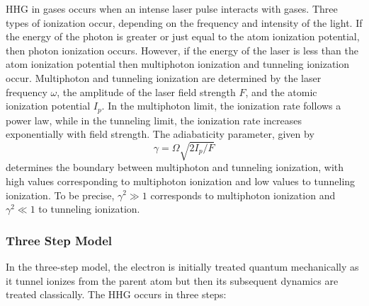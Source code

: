 \documentclass[12pt]{article}
\begin{document}
HHG in gases occurs when an intense laser pulse interacts with gases. Three types of ionization occur, depending on the frequency and intensity of the light. If the energy of the photon is greater or just equal to the atom ionization potential, then photon ionization occurs. However, if the energy of the laser is less than the atom ionization potential then multiphoton ionization and tunneling ionization occur. Multiphoton and tunneling ionization are determined by the laser frequency \(\omega\), the amplitude of the laser field strength $F$, and the atomic ionization potential \(I_p\). In the multiphoton limit, the ionization rate follows a power law, while in the tunneling limit, the ionization rate increases exponentially with field strength. The adiabaticity parameter, given by
\begin{equation}
    \label{eq:adiabatic}
    \gamma =\Omega \sqrt{2I_p/F}
\end{equation}
determines the boundary between multiphoton and tunneling ionization, with high values corresponding to multiphoton ionization and low values to tunneling ionization. To be precise, $\gamma^2 \gg 1$ corresponds to multiphoton ionization and $\gamma^2 \ll 1$ to tunneling ionization.\cite{gas-second}

\subsubsection{Three Step Model}

In the three-step model, the electron is initially treated quantum
mechanically as it tunnel ionizes from the parent atom but then its
subsequent dynamics are treated classically. The HHG occurs in three steps:
\end{document}

